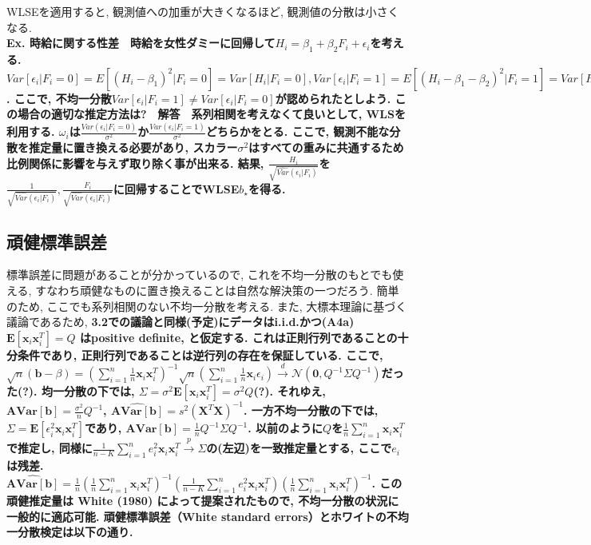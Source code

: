 \documentclass[paper=a4paper,fontsize=10pt]{jlreq}
\begin{document}
WLSEを適用すると, 観測値への加重が大きくなるほど, 観測値の分散は小さくなる.\\

\rmfamily\mcfamily\bfseries{Ex. 時給に関する性差}\mdseries　時給を女性ダミーに回帰して$H_i = \beta_1 + \beta_2 F_i + \epsilon_i$を考える. $Var[\epsilon_i|F_i= 0] = E[(H_i - \beta_1)^2|F_i= 0] = Var[H_i |F_i= 0], Var[\epsilon_i|F_i= 1] = E[(H_i - \beta_1 - \beta_2)^2|F_i= 1] = Var[H_i |F_i = 1]$. ここで, 不均一分散$Var[\epsilon_i|F_i= 1] \neq Var[\epsilon_i|F_i= 0]$が認められたとしよう. この場合の適切な推定方法は?　\rmfamily\mcfamily\bfseries{解答}\mdseries　系列相関を考えなくて良いとして, WLSを利用する. $\omega_i$は$\frac{Var(\epsilon_i|F_i=0)}{\sigma^2}$か$\frac{Var(\epsilon_i|F_i=1)}{\sigma^2}$どちらかをとる. ここで, 観測不能な分散を推定量に置き換える必要があり, スカラー$\sigma^2$はすべての重みに共通するため比例関係に影響を与えず取り除く事が出来る. 結果, $\frac{H_i}{\sqrt{\hat{Var}(\epsilon_i|F_i)}}$を$\frac{1}{\sqrt{\hat{Var}(\epsilon_i|F_i)}}, \frac{F_i}{\sqrt{\hat{Var}(\epsilon_i|F_i)}}$に回帰することでWLSE$b_\star$を得る.\\

\subsection{頑健標準誤差}
標準誤差に問題があることが分かっているので, これを不均一分散のもとでも使える, すなわち頑健なものに置き換えることは自然な解決策の一つだろう. 簡単のため, ここでも系列相関のない不均一分散を考える. また, 大標本理論に基づく議論であるため, \rmfamily\mcfamily\bfseries{3.2}\mdseries での議論と同様(予定)にデータはi.i.d.かつ(A4a) $\mathbf{E}[\mathbf{x}_i\mathbf{x}_i^T] = Q$ はpositive definite, と仮定する. これは正則行列であることの十分条件であり, 正則行列であることは逆行列の存在を保証している. ここで, $\sqrt{n}(\mathbf{b}-\beta)=(\sum_{i=1}^{n} \frac{1}{n}\mathbf{x}_i\mathbf{x}_i^T)^{-1}\sqrt{n}(\sum_{i=1}^{n} \frac{1}{n}\mathbf{x}_i\epsilon_i)\overset{d}{\to} \mathcal{N}(\mathbf{0}, Q^{-1}\Sigma Q^{-1})$だった(?). 均一分散の下では, $\Sigma=\sigma^2\mathbf{E}[\mathbf{x}_i\mathbf{x}_i^T] = \sigma^2Q$(?). それゆえ, $\mathbf{ \text{AVar}[b]}=\frac{\sigma^2}{n}Q^{-1}$, $\hat{\mathbf{\text{AVar}}[\mathbf{b}]}=s^2(\mathbf{X}^T\mathbf{X})^{-1}$. 一方不均一分散の下では, $\Sigma=\mathbf{E}[\epsilon_i^2\mathbf{x}_i\mathbf{x}_i^T]$であり, $\mathbf{ \text{AVar}[b]}=\frac{1}{n}Q^{-1}\Sigma Q^{-1}$. 以前のように$Q$を$\frac{1}{n}\sum_{i=1}^{n} \mathbf{x}_i\mathbf{x}_i^T$で推定し, 同様に$\frac{1}{n-K}\sum_{i=1}^{n} e_i^2\mathbf{x}_i\mathbf{x}_i^T \overset{p}{\to} \Sigma$の(左辺)を一致推定量とする, ここで$e_i$は残差. $\hat{\mathbf{\text{AVar}}[\mathbf{b}]}=\frac{1}{n} (\frac{1}{n}\sum_{i=1}^{n} \mathbf{x}_i\mathbf{x}_i^T)^{-1} (\frac{1}{n-K}\sum_{i=1}^{n} e_i^2\mathbf{x}_i\mathbf{x}_i^T) (\frac{1}{n}\sum_{i=1}^{n} \mathbf{x}_i\mathbf{x}_i^T)^{-1}$. この頑健推定量は White (1980) によって提案されたもので, 不均一分散の状況に一般的に適応可能. 頑健標準誤差（White standard errors）とホワイトの不均一分散検定は以下の通り.
\end{document}
